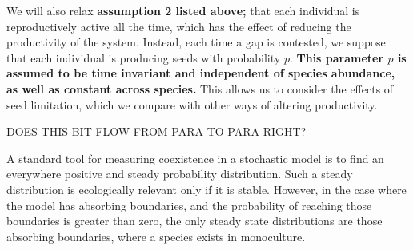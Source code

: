 We will also relax \textbf{assumption 2 listed above;} that each individual is reproductively active all the time, which has the effect of reducing the productivity of the system. Instead, each time a gap is contested, we suppose that each individual is producing seeds with probability $p$. \textbf{This parameter $p$ is assumed to be time invariant and independent of species abundance, as well as constant across species.} This allows us to consider the effects of seed limitation, which we compare with other ways of altering productivity.

DOES THIS BIT FLOW FROM PARA TO PARA RIGHT?

A standard tool for measuring coexistence in a stochastic model is to find an everywhere positive and steady probability distribution. Such a steady distribution is ecologically relevant only if it is stable. However, in the case where the model has absorbing boundaries, and the probability of reaching those boundaries is greater than zero, the only steady state distributions are those absorbing boundaries, where a species exists in monoculture. 

